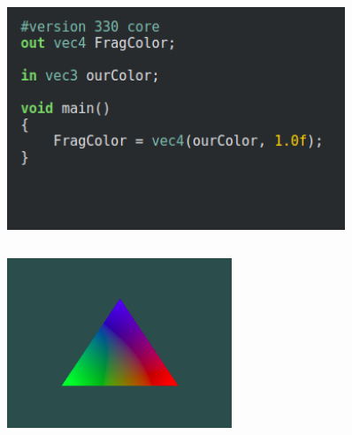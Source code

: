 \documentclass[aspectratio=169]{beamer}
\begin{document}
\begin{frame}[allowframebreaks]
\begin{columns}
		\begin{column}{0.5\textwidth}
			\begin{figure}
				\centering
				\includegraphics[width=0.9\textwidth]{fragment_shader.png}
			\end{figure}
		\end{column}
	\end{columns}
	\framebreak
	
	\begin{figure}
	\centering
	\includegraphics[width=0.6\textwidth]{shader_result.png}
	\end{figure}
\end{frame}
\end{document}
